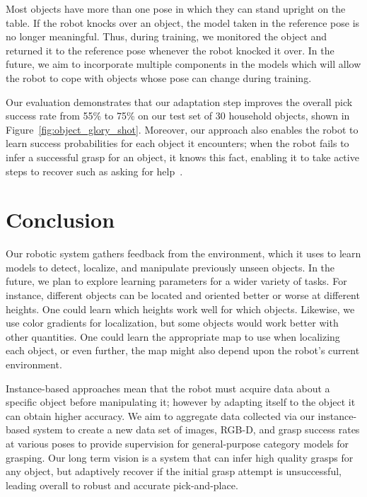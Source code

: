 \documentclass[conference,onecolumn]{IEEEtran}
\begin{document}
Most objects have more than one pose in which they can stand upright
on the table. If the robot knocks over an object, the model taken in
the reference pose is no longer meaningful. Thus, during training, we
monitored the object and returned it to the reference pose whenever
the robot knocked it over. In the future, we aim to incorporate
multiple components in the models which will allow the robot to cope
with objects whose pose can change during training.

Our evaluation demonstrates that our adaptation step improves the
overall pick success rate from 55\% to 75\% on our test set of 30
household objects, shown in Figure~\ref{fig:object_glory_shot}.
Moreover, our approach also enables the robot to learn success
probabilities for each object it encounters; when the robot fails to
infer a successful grasp for an object, it knows this fact, enabling
it to take active steps to recover such as asking for
help~\citep{tellex14}.





\section*{Conclusion}

Our robotic system gathers feedback from the environment, which it
uses to learn models to detect, localize, and manipulate previously
unseen objects. In the future, we plan to explore learning parameters
for a wider variety of tasks.  For instance, different objects can be
located and oriented better or worse at different heights. One could
learn which heights work well for which objects.  Likewise, we use
color gradients for localization, but some objects would work better
with other quantities. One could learn the appropriate map to use when
localizing each object, or even further, the map might also depend
upon the robot's current environment.

Instance-based approaches mean that the robot must acquire data about
a specific object before manipulating it; however by adapting itself
to the object it can obtain higher accuracy.  We aim to aggregate data
collected via our instance-based system to create a new data set of
images, RGB-D, and grasp success rates at various poses to provide
supervision for general-purpose category models for grasping.  Our
long term vision is a system that can infer high quality grasps for
any object, but adaptively recover if the initial grasp attempt is
unsuccessful, leading overall to robust and accurate pick-and-place.
\end{document}
